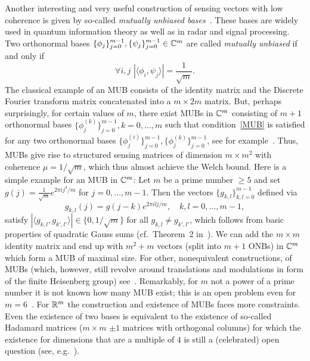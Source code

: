 Another interesting and very useful construction of sensing vectors with low coherence is given by so-called {\em mutually unbiased bases}~\cite{wootters1989optimal,durt2010mutually,bandyopadhyay2002new,calderbank1997,SH03}. These bases are widely used in quantum information theory as well as in radar and signal processing. Two orthonormal bases $\{ \phi_j \}_{j=0}^{m-1}, \{ \psi_j \}_{j=0}^{m-1} \in \mathbb{C}^m$ are called {\em mutually unbiased}
if and only if 
\begin{equation}\label{MUB}
\forall i,j \,\, | \langle \phi_i, \psi_j \rangle | = \frac{1}{\sqrt{m}}.
\end{equation}
The classical example of an MUB consists of the identity matrix and the Discrete Fourier transform matrix concatenated into a $m\times 2m$ matrix. But, perhaps surprisingly, for certain values of $m$, there exist MUBs in $\mathbb{C}^m$ consisting of $m+1$ orthonormal bases $\{ \phi^{(k)}_j \}_{j=0}^{m-1}, k=0,\dots,m$ such that condition~\eqref{MUB} is satisfied for any two orthonormal bases
$\{\phi^{(i)}_j\}_{j=0}^{m-1}, \{\phi^{(k)}_j\}_{j=0}^{m-1}$, 
see for example~\cite{wootters1989optimal,bandyopadhyay2002new,calderbank1997,SH03,alltop1980complex}.
Thus, MUBs give rise to structured sensing matrices of dimension $m \times m^2$ with coherence $\mu = 1/\sqrt{m}$, which thus almost achieve the Welch bound.
Here is a simple example for an MUB in $\mathbb{C}^m$: Let $m$ be a prime number $\ge 5$ and set $g(j) = \frac{1}{\sqrt{m}}e^{2\pi i j^3/m}$
for $j=0,\dots,m-1$. Then the vectors $\{g_{k,l}\}_{k,l=0}^{m-1}$ defined via
\begin{equation}
g_{k,l}(j) = g(j-k) e^{2\pi i lj/m}, \quad k,l=0,\dots,m-1,
\label{fingabor}
\end{equation}
satisfy $|\langle g_{k,l}, g_{k',l'} \rangle| \in \{0,1/\sqrt{m}\}$
for all $g_{k,l} \neq g_{k',l'}$, which follows from basic properties of quadratic Gauss sums (cf.~Theorem~2 in~\cite{alltop1980complex}).
We can add the $m \times m$ identity matrix and end up with $m^2+m$ vectors (split into $m+1$ ONBs) in $\mathbb{C}^m$ which form a MUB of maximal size.
For other, nonequivalent constructions, of MUBs (which, however, still revolve around translations and modulations in form of the finite Heisenberg group) 
see~\cite{calderbank1997}.
Remarkably, for $m$ not a power of a prime number it is not known how many MUB exist; this is an open problem even for $m=6$~\cite{RandomstrasseProblems2024}.
For $\mathbb{R}^m$ the construction and existence of MUBs faces more constraints. Even the existence of two bases is equivalent to the existence of so-called Hadamard matrices ($m\times m$ $\pm1$ matrices with orthogonal columns) for which the existence for dimensions that are a multiple of $4$ is still a (celebrated) open question (see, e.g.~\cite{RandomstrasseProblems2024}). 




